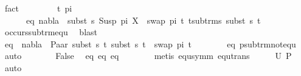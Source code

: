 \begin{isabellebody}
\ fact\isanewline
\ \ \ \ \ \isamarkupfalse%
\ \isamarkupfalse%
\ t{\isacharprime}{\kern0pt}\ pi{\isacharprime}{\kern0pt}\ \ \ \isanewline
\ \ \ \ \ \ eq{}{\isacharcolon}{\kern0pt}\ {\isachardoublequoteopen}nabla\ {\isasymturnstile}\ subst\ s\ {\isacharparenleft}{\kern0pt}Susp\ pi\ X{\isacharparenright}{\kern0pt}\ {\isasymapprox}\ swap\ pi{\isacharprime}{\kern0pt}\ t{\isacharprime}{\kern0pt}{\isachardoublequoteclose}\ {\isachardoublequoteopen}t{\isacharprime}{\kern0pt}{\isasymin}sub{\isacharunderscore}{\kern0pt}trms\ {\isacharparenleft}{\kern0pt}subst\ s\ t{}{\isacharparenright}{\kern0pt}{\isachardoublequoteclose}\isanewline
\ \ \ \ \ \ \isamarkupfalse%
\ occurs{\isacharunderscore}{\kern0pt}sub{\isacharunderscore}{\kern0pt}trm{\isacharunderscore}{\kern0pt}equ\ \isamarkupfalse%
\ blast\isanewline
\ \ \ \ \isamarkupfalse%
\ \ \isanewline
\ \ \ \ \isamarkupfalse%
\ eq{}{\isacharcolon}{\kern0pt}\ {\isachardoublequoteopen}{\isasymnot}\ nabla\ {\isasymturnstile}\ {\isacharparenleft}{\kern0pt}Paar\ {\isacharparenleft}{\kern0pt}subst\ s\ t{}{\isacharparenright}{\kern0pt}\ {\isacharparenleft}{\kern0pt}subst\ s\ t{}{\isacharparenright}{\kern0pt}{\isacharparenright}{\kern0pt}\ {\isasymapprox}\ swap\ pi{\isacharprime}{\kern0pt}\ t{\isacharprime}{\kern0pt}{\isachardoublequoteclose}\isanewline
\ \ \ \ \ \ \isamarkupfalse%
\ eq{}\ psub{\isacharunderscore}{\kern0pt}trm{\isacharunderscore}{\kern0pt}not{\isacharunderscore}{\kern0pt}equ\ \isamarkupfalse%
\ auto\isanewline
\ \ \ \ \isamarkupfalse%
\ \isamarkupfalse%
\ {\isachardoublequoteopen}False{\isachardoublequoteclose}\ \isamarkupfalse%
\ eq{}\ eq{}\ eq{}\isanewline
\ \ \ \ \ \ \isamarkupfalse%
\ {\isacharparenleft}{\kern0pt}metis\ equ{\isacharunderscore}{\kern0pt}symm\ equ{\isacharunderscore}{\kern0pt}trans{\isacharparenright}{\kern0pt}\isakeywordONE{{\isacharbraceright}{\kern0pt}}\isamarkupfalse%
\isanewline
\ \ \isamarkupfalse%
\ \isamarkupfalse%
\ {\isachardoublequoteopen}U\ {\isacharquery}{\kern0pt}P\ {\isacharequal}{\kern0pt}\ {\isacharbraceleft}{\kern0pt}{\isacharbraceright}{\kern0pt}{\isachardoublequoteclose}\ \isamarkupfalse%
\ auto\isakeywordONE{{\isacharbraceright}{\kern0pt}}\isamarkupfalse%

\end{isabellebody}
